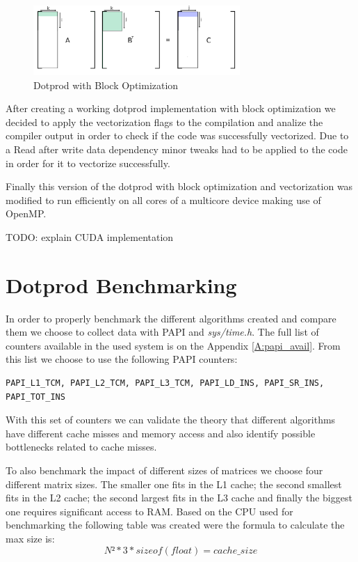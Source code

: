 \documentclass[a4paper]{report}
\begin{document}
\begin{figure}[H]
    \centering
        \includegraphics[width=0.7\textwidth]{images/matrix_mult_block.png}
        \caption{Dotprod with Block Optimization}
\end{figure}

After creating a working dotprod implementation with block optimization we
decided to apply the vectorization flags to the compilation and analize the
compiler output in order to check if the code was successfully vectorized. Due
to a Read after write data dependency minor tweaks had to be applied to the code
in order for it to vectorize successfully.

Finally this version of the dotprod with block optimization and vectorization
was modified to run efficiently on all cores of a multicore device making use of
OpenMP.

TODO: explain CUDA implementation

\chapter{Dotprod Benchmarking}
In order to properly benchmark the different algorithms created and compare them
we choose to collect data with PAPI and \textit{sys/time.h}. The full list of
counters available in the used system is on the Appendix \ref{A:papi_avail}. From
this list we choose to use the following PAPI counters:
\begin{verbatim}
PAPI_L1_TCM, PAPI_L2_TCM, PAPI_L3_TCM, PAPI_LD_INS, PAPI_SR_INS, PAPI_TOT_INS
\end{verbatim}

With this set of counters we can validate the theory that different algorithms
have different cache misses and memory access and also identify possible
bottlenecks related to cache misses.

To also benchmark the impact of different sizes of matrices we choose four
different matrix sizes. The smaller one fits in the L1 cache; the second
smallest fits in the L2 cache; the second largest fits in the L3 cache and
finally the biggest one requires significant access to RAM. Based on the CPU
used for benchmarking the following table was created were the formula to
calculate the max size is: \[N²*3*sizeof(float) = cache\_size\]
\end{document}
